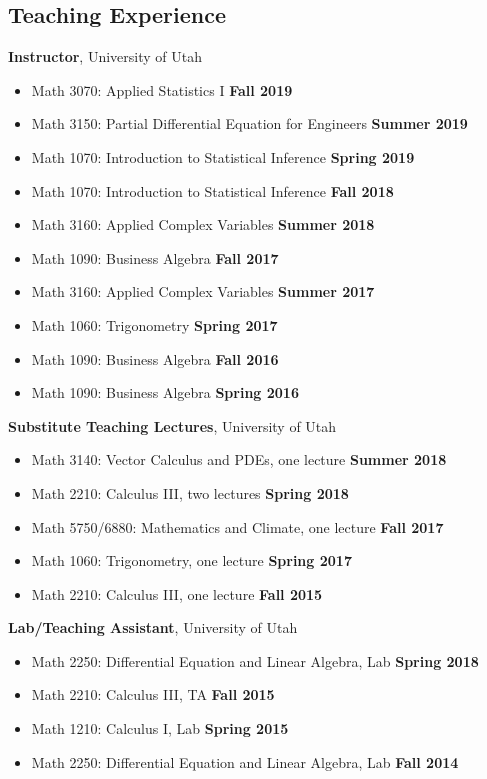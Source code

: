 \documentclass[margin,line]{res}
\begin{document}
\begin{resume}
\section{\sc Teaching Experience}
{\bf Instructor}, University of Utah
\vspace*{.05in}
\begin{itemize}
\item[ ] Math 3070: Applied Statistics I \hfill {\bf Fall 2019}
\item[ ] Math 3150: Partial Differential Equation for Engineers \hfill {\bf Summer 2019}
\item[ ] Math 1070: Introduction to Statistical Inference \hfill {\bf Spring 2019}
\item[ ] Math 1070: Introduction to Statistical Inference \hfill {\bf Fall 2018}
\item[ ] Math 3160: Applied Complex Variables \hfill {\bf Summer 2018}
\item[ ] Math 1090: Business Algebra \hfill {\bf Fall 2017}
\item[ ] Math 3160: Applied Complex Variables \hfill {\bf Summer 2017}
\item[ ] Math 1060: Trigonometry \hfill {\bf Spring 2017}
\item[ ] Math 1090: Business Algebra \hfill {\bf Fall 2016}
\item[ ] Math 1090: Business Algebra \hfill {\bf Spring 2016}
\end{itemize}
{\bf Substitute Teaching Lectures}, University of Utah
\vspace*{.05in}
\begin{itemize}
\item[ ] Math 3140: Vector Calculus and PDEs, one lecture \hfill {\bf Summer 2018}
\item[ ] Math 2210: Calculus III, two lectures \hfill {\bf Spring 2018}
\item[ ] Math 5750/6880: Mathematics and Climate, one lecture \hfill {\bf Fall 2017}
\item[ ] Math 1060: Trigonometry, one lecture \hfill {\bf Spring 2017}
\item[ ] Math 2210: Calculus III, one lecture \hfill {\bf Fall 2015}
\end{itemize}
{\bf Lab/Teaching Assistant}, University of Utah
\vspace*{.05in}
\begin{itemize}
\item[ ] Math 2250: Differential Equation and Linear Algebra, Lab \hfill {\bf Spring 2018}
\item[ ] Math 2210: Calculus III, TA \hfill {\bf Fall 2015}
\item[ ] Math 1210: Calculus I, Lab \hfill {\bf Spring 2015}
\item[ ] Math 2250: Differential Equation and Linear Algebra, Lab \hfill {\bf Fall 2014}
\end{itemize}


\end{resume}
\end{document}
